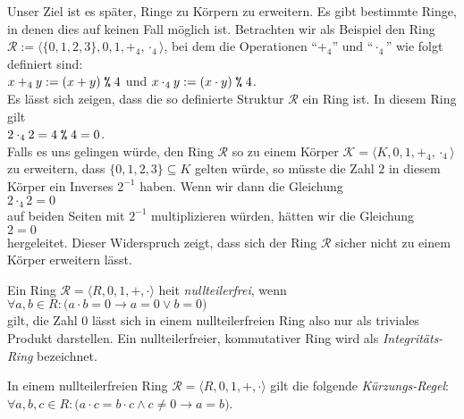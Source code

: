 Unser Ziel ist es sp\"{a}ter, Ringe zu K\"{o}rpern zu erweitern.  Es gibt bestimmte Ringe, in
denen dies auf keinen Fall m\"{o}glich ist.  Betrachten wir als Beispiel den Ring
$\mathcal{R} := \langle \{ 0, 1, 2, 3 \}, 0, 1, +_4, \cdot_4 \rangle$, bei dem die Operationen
``$+_4$'' und ``$\cdot_4$'' wie folgt definiert sind:
\\[0.2cm]
\hspace*{1.3cm}
$x +_4 y := (x + y) \;\texttt{\%}\; 4$ \quad und \quad
$x \cdot_4 y := (x \cdot y) \;\texttt{\%}\; 4$.
\\[0.2cm]
Es l\"{a}sst sich zeigen, dass die so definierte Struktur $\mathcal{R}$ ein Ring ist.  In
diesem Ring gilt
\\[0.2cm]
\hspace*{1.3cm}
$2 \cdot_4 2 = 4 \;\texttt{\%}\; 4 = 0$.
\\[0.2cm]
Falls es uns gelingen w\"{u}rde, den Ring $\mathcal{R}$ so zu einem K\"{o}rper 
$\mathcal{K} = \langle K, 0, 1, +_4, \cdot_4 \rangle$ zu erweitern, dass 
$\{0,1,2,3\} \subseteq K$ gelten w\"{u}rde, so m\"{u}sste die Zahl 
$2$ in diesem K\"{o}rper ein Inverses $2^{-1}$ haben.  Wenn wir dann die Gleichung
\\[0.2cm]
\hspace*{1.3cm}
$2 \cdot_4 2 = 0$
\\[0.2cm]
auf beiden Seiten mit $2^{-1}$ multiplizieren w\"{u}rden, h\"{a}tten wir die Gleichung
\\[0.2cm]
\hspace*{1.3cm}
$2 = 0$
\\[0.2cm]
hergeleitet.  Dieser Widerspruch zeigt, dass sich der Ring $\mathcal{R}$ sicher nicht zu
einem K\"{o}rper erweitern l\"{a}sst.

\begin{Definition}
  Ein Ring $\mathcal{R} = \langle R, 0, 1, +, \cdot \rangle$ hei\3t {\color{blue}\emph{nullteilerfrei}}, wenn
  \\[0.2cm]
  \hspace*{1.3cm}
  $\forall a, b \in R: \bigl(a \cdot b = 0 \rightarrow a = 0 \vee b = 0\bigr)$
  \\[0.2cm]
  gilt, die Zahl $0$ l\"{a}sst sich in einem nullteilerfreien Ring also nur als triviales Produkt darstellen.
  Ein nullteilerfreier, kommutativer Ring wird als {\color{blue}\emph{Integrit\"{a}ts-Ring}}
  bezeichnet.
\eoxs
\end{Definition}

\remark
In einem nullteilerfreien Ring $\mathcal{R} = \langle R, 0, 1, +, \cdot \rangle$ 
gilt die folgende \emph{\color{blue}K\"urzungs-Regel}:
\\[0.2cm]
\hspace*{1.3cm}
$\forall a,b,c \in R: \bigl(a \cdot c = b \cdot c \wedge c \not= 0 \rightarrow a = b)$.
\eoxs

